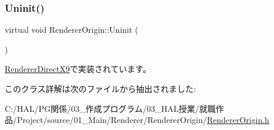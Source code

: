 \mbox{\label{class_renderer_origin_ac3635770d5d681fe42940fab32bb83cb}} 
\subsubsection{\texorpdfstring{Uninit()}{Uninit()}}
{\footnotesize\ttfamily virtual void Renderer\+Origin\+::\+Uninit (\begin{DoxyParamCaption}{ }\end{DoxyParamCaption})\hspace{0.3cm}{\ttfamily [pure virtual]}}



\mbox{\hyperlink{class_renderer_direct_x9_a61c375254fc0a827873fb4c72181f0d5}{Renderer\+Direct\+X9}}で実装されています。



このクラス詳解は次のファイルから抽出されました\+:\begin{DoxyCompactItemize}
\item 
C\+:/\+H\+A\+L/\+P\+G関係/03\+\_\+作成プログラム/03\+\_\+\+H\+A\+L授業/就職作品/\+Project/source/01\+\_\+\+Main/\+Renderer/\+Renderer\+Origin/\mbox{\hyperlink{_renderer_origin_8h}{Renderer\+Origin.\+h}}\end{DoxyCompactItemize}
